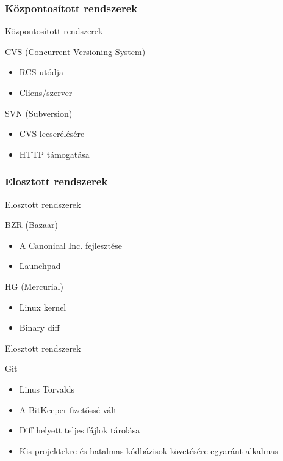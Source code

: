 \documentclass[display,t]{beamer}
\begin{document}
\subsubsection{Központosított rendszerek}

\begin{frame}{Központosított rendszerek}
    \pause
    \begin{block}{CVS (Concurrent Versioning System)}
        \begin{itemize}
            \pause \item RCS utódja
            \pause \item Cliens/szerver
        \end{itemize}
    \end{block}
    \pause
    \begin{block}{SVN (Subversion)}
        \begin{itemize}
            \pause \item CVS lecserélésére
            \pause \item HTTP támogatása
        \end{itemize}
    \end{block}
\end{frame}

\subsubsection{Elosztott rendszerek}

\begin{frame}{Elosztott rendszerek}
    \pause
    \begin{block}{BZR (Bazaar)}
        \begin{itemize}
            \pause \item A Canonical Inc. fejlesztése
            \pause \item Launchpad
        \end{itemize}
    \end{block}
    \pause
    \begin{block}{HG (Mercurial)}
        \begin{itemize}
            \pause \item Linux kernel
            \pause \item Binary diff
        \end{itemize}
    \end{block}
\end{frame}

\begin{frame}{Elosztott rendszerek}
    \pause
    \begin{block}{Git}
        \begin{itemize}
            \pause \item Linus Torvalds
            \pause \item A BitKeeper fizetőssé vált
            \pause \item Diff helyett teljes fájlok tárolása
            \pause \item Kis projektekre és hatalmas kódbázisok követésére egyaránt alkalmas
        \end{itemize}
    \end{block}
\end{frame}
\end{document}
